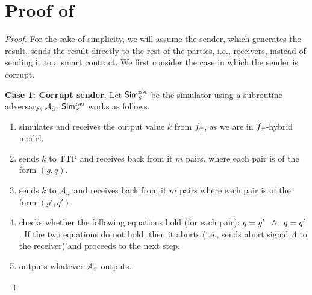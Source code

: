 


\section{Proof of \zspa}\label{sec::proof-of-zspa}


\begin{proof}
For the sake of simplicity, we will assume the sender, which generates the result, sends the result directly to the rest of the parties, i.e., receivers, instead of sending it to a smart contract. We first consider the case in which the sender is corrupt. 



\noindent\textbf{Case 1: Corrupt sender.}  Let $\mathsf{Sim}^{\scriptscriptstyle \mathtt{ZSPA}}_{\scriptscriptstyle S}$ be the simulator using a subroutine adversary, $\mathcal{A}_{\scriptscriptstyle S}$. $\mathsf{Sim}^{\scriptscriptstyle \mathtt{ZSPA}}_{\scriptscriptstyle S}$ works as follows. 
%
\begin{enumerate}
%
\item simulates  \ct  and receives the output value $k$ from $f_{\scriptscriptstyle \mathtt{CT}}$, as we are in $f_{\scriptscriptstyle \mathtt{CT}}$-hybrid model.
%
\item sends $k$ to TTP and receives back from it $m$ pairs, where each pair is of the form $( g,  q)$. 
%
\item sends $ k$ to $\mathcal{A}_{\scriptscriptstyle S}$ and receives back from it $m$ pairs  where each pair is of the form $( g',  q')$. 
%
\item checks whether the following equations hold (for each pair): $ g= g' \hspace{2mm} \wedge  \hspace{2mm}  q= q'$. If the two equations do not hold, then it aborts (i.e., sends abort signal $\Lambda$ to the receiver) and proceeds to the next step.
%
\item outputs whatever $\mathcal{A}_{\scriptscriptstyle S}$ outputs.
%
 \end{enumerate}
 

\end{proof}
